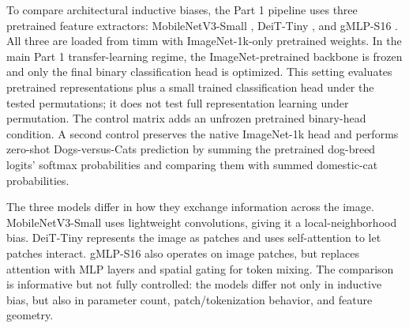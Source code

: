 \documentclass[12pt]{article}
\begin{document}
To compare architectural inductive biases, the Part 1 pipeline uses three pretrained feature extractors: MobileNetV3-Small \citep{howard2019searching}, DeiT-Tiny \citep{touvron2021deit}, and gMLP-S16 \citep{liu2021pay}. All three are loaded from timm with ImageNet-1k-only pretrained weights. In the main Part 1 transfer-learning regime, the ImageNet-pretrained backbone is frozen and only the final binary classification head is optimized. This setting evaluates pretrained representations plus a small trained classification head under the tested permutations; it does not test full representation learning under permutation. The control matrix adds an unfrozen pretrained binary-head condition. A second control preserves the native ImageNet-1k head and performs zero-shot Dogs-versus-Cats prediction by summing the pretrained dog-breed logits' softmax probabilities and comparing them with summed domestic-cat probabilities.

The three models differ in how they exchange information across the image. MobileNetV3-Small uses lightweight convolutions, giving it a local-neighborhood bias. DeiT-Tiny represents the image as patches and uses self-attention to let patches interact. gMLP-S16 also operates on image patches, but replaces attention with MLP layers and spatial gating for token mixing. The comparison is informative but not fully controlled: the models differ not only in inductive bias, but also in parameter count, patch/tokenization behavior, and feature geometry.

\begin{table}[t]
  \centering
  \caption{Architectural comparison of the three frozen feature extractors.}
  \label{tab:model-architecture-comparison}
\end{table}
\end{document}
